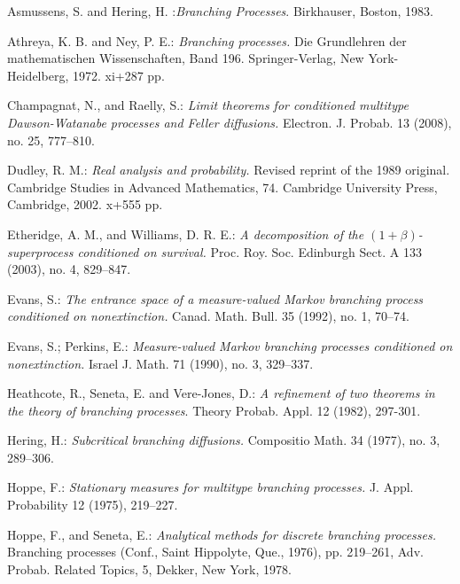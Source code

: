 \documentclass[12pt,a4paper]{amsart}
\numberwithin{equation}{section}
\theoremstyle{plain}
\theoremstyle{definition}
\theoremstyle{remark}
\begin{document}
\begin{thebibliography}{99}

	Asmussens, S. and Hering, H. :\emph{Branching Processes}. Birkhauser, Boston, 1983.

	Athreya, K. B. and Ney, P. E.:
	\emph{Branching processes.}
	Die Grundlehren der mathematischen Wissenschaften, Band 196. Springer-Verlag, New York-Heidelberg, 1972. xi+287 pp.
	
	Champagnat, N., and Raelly, S.:
	\emph{Limit theorems for conditioned multitype Dawson-Watanabe processes and Feller diffusions.}
	Electron. J. Probab. 13 (2008), no. 25, 777–810.

	Dudley, R. M.:
	\emph{Real analysis and probability.}
	Revised reprint of the 1989 original. Cambridge Studies in Advanced Mathematics, 74. Cambridge University Press, Cambridge, 2002. x+555 pp.
	
	Etheridge, A. M., and Williams, D. R. E.:
	\emph{A decomposition of the $(1+\beta)$-superprocess conditioned on survival.}
	Proc. Roy. Soc. Edinburgh Sect. A 133 (2003), no. 4, 829–847.
	
	Evans, S.:
	\emph{The entrance space of a measure-valued Markov branching process conditioned on nonextinction.}
	Canad. Math. Bull. 35 (1992), no. 1, 70–74.
	
	Evans, S.; Perkins, E.:
	\emph{Measure-valued Markov branching processes conditioned on nonextinction.}
	Israel J. Math. 71 (1990), no. 3, 329–337.

	Heathcote, R.,  Seneta, E.  and Vere-Jones, D.:  
	\emph{ A refinement of two theorems in the theory of branching processes}. 
	Theory Probab. Appl. 12 (1982), 297-301.
	
	Hering, H.:
	\emph{Subcritical branching diffusions.}
	Compositio Math. 34 (1977), no. 3, 289–306.
	
	Hoppe, F.:
	\emph{Stationary measures for multitype branching processes.}
	J. Appl. Probability 12 (1975), 219–227.
	
	Hoppe, F., and Seneta, E.:
	\emph{Analytical methods for discrete branching processes.} 
	Branching processes (Conf., Saint Hippolyte, Que., 1976), pp. 219–261, Adv. Probab. Related Topics, 5, Dekker, New York, 1978.
	

\end{thebibliography}
\end{document}
